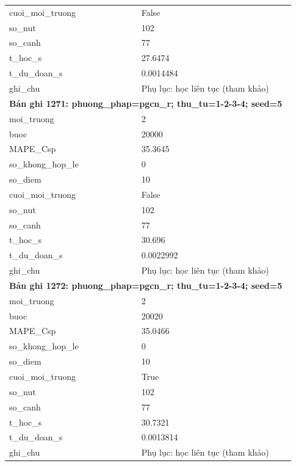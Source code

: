 \begin{longtable}{p{0.43\linewidth}p{0.50\linewidth}}
cuoi\_\allowbreak moi\_\allowbreak truong & False \\
so\_\allowbreak nut & 102 \\
so\_\allowbreak canh & 77 \\
t\_\allowbreak hoc\_\allowbreak s & 27.6474 \\
t\_\allowbreak du\_\allowbreak doan\_\allowbreak s & 0.0014484 \\
ghi\_\allowbreak chu & Phụ lục: học liên tục (tham khảo) \\
\midrule
\multicolumn{2}{p{0.95\linewidth}}{\textbf{Bản ghi 1271: phuong\_phap=pgcn\_r; thu\_tu=1-2-3-4; seed=5}} \\
moi\_\allowbreak truong & 2 \\
buoc & 20000 \\
MAPE\_\allowbreak Csp & 35.3645 \\
so\_\allowbreak khong\_\allowbreak hop\_\allowbreak le & 0 \\
so\_\allowbreak diem & 10 \\
cuoi\_\allowbreak moi\_\allowbreak truong & False \\
so\_\allowbreak nut & 102 \\
so\_\allowbreak canh & 77 \\
t\_\allowbreak hoc\_\allowbreak s & 30.696 \\
t\_\allowbreak du\_\allowbreak doan\_\allowbreak s & 0.0022992 \\
ghi\_\allowbreak chu & Phụ lục: học liên tục (tham khảo) \\
\midrule
\multicolumn{2}{p{0.95\linewidth}}{\textbf{Bản ghi 1272: phuong\_phap=pgcn\_r; thu\_tu=1-2-3-4; seed=5}} \\
moi\_\allowbreak truong & 2 \\
buoc & 20020 \\
MAPE\_\allowbreak Csp & 35.0466 \\
so\_\allowbreak khong\_\allowbreak hop\_\allowbreak le & 0 \\
so\_\allowbreak diem & 10 \\
cuoi\_\allowbreak moi\_\allowbreak truong & True \\
so\_\allowbreak nut & 102 \\
so\_\allowbreak canh & 77 \\
t\_\allowbreak hoc\_\allowbreak s & 30.7321 \\
t\_\allowbreak du\_\allowbreak doan\_\allowbreak s & 0.0013814 \\
ghi\_\allowbreak chu & Phụ lục: học liên tục (tham khảo) \\

\end{longtable}
